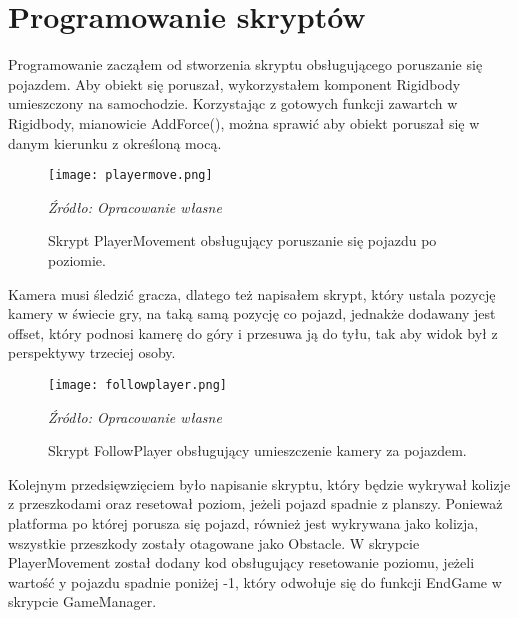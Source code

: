\section{Programowanie skryptów}
\indent Programowanie zacząłem od stworzenia skryptu obsługującego poruszanie się pojazdem. Aby obiekt się poruszał, wykorzystałem komponent Rigidbody umieszczony na samochodzie. Korzystając z gotowych funkcji zawartch w Rigidbody, mianowicie AddForce(), można sprawić aby obiekt poruszał się w danym kierunku z określoną mocą.

\begin{figure}[!h]
\centering
  \texttt{[image: playermove.png]}
  \caption{Skrypt PlayerMovement obsługujący poruszanie się pojazdu po poziomie.}\label{rys_3}
  \begin{minipage}[t]{0.75\linewidth}
    \emph{Źródło: Opracowanie własne}
  \end{minipage}
\end{figure}

\indent Kamera musi śledzić gracza, dlatego też napisałem skrypt, który ustala pozycję kamery w świecie gry, na taką samą pozycję co pojazd, jednakże dodawany jest offset, który podnosi kamerę do góry i przesuwa ją do tyłu, tak aby widok był z perspektywy trzeciej osoby.

\begin{figure}[!h]
\centering
  \texttt{[image: followplayer.png]}
  \caption{Skrypt FollowPlayer obsługujący umieszczenie kamery za pojazdem.}\label{rys_4}
  \begin{minipage}[t]{0.75\linewidth}
    \emph{Źródło: Opracowanie własne}
  \end{minipage}
\end{figure}

\newpage
\indent Kolejnym przedsięwzięciem było napisanie skryptu, który będzie wykrywał kolizje z przeszkodami oraz resetował poziom, jeżeli pojazd spadnie z planszy. Ponieważ platforma po której porusza się pojazd, również jest wykrywana jako kolizja, wszystkie przeszkody zostały otagowane jako Obstacle. W skrypcie PlayerMovement został dodany kod obsługujący resetowanie poziomu, jeżeli wartość y pojazdu spadnie poniżej -1, który odwołuje się do funkcji EndGame w skrypcie GameManager.

